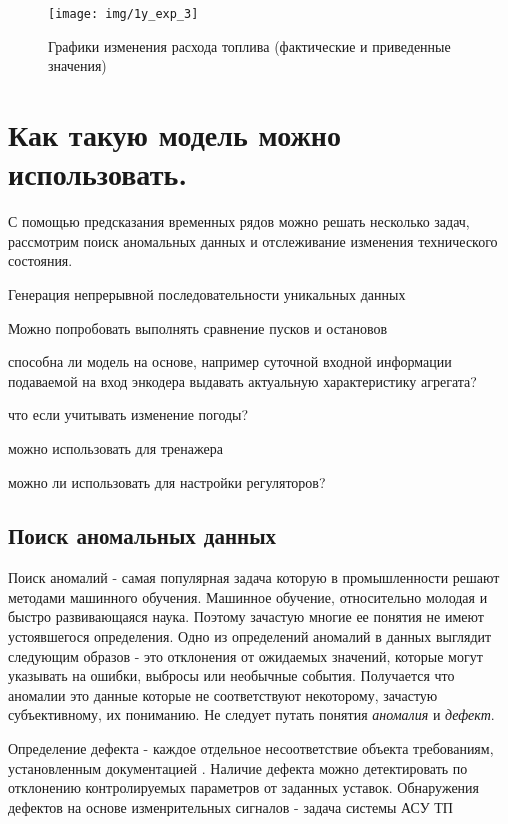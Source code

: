 \documentclass[12pt,a4paper]{article}
\begin{document}
\begin{figure}[htbp]
	\centering\texttt{[image: img/1y\_exp\_3]}
	\caption{Графики изменения расхода топлива (фактические и приведенные значения)}
	\label{fig:1y_exp_3}
\end{figure}

\newpage
\section{Как такую модель можно использовать.}

С помощью предсказания временных рядов можно решать несколько задач, рассмотрим поиск аномальных данных и отслеживание изменения технического состояния.

Генерация непрерывной последовательности уникальных данных

Можно попробовать выполнять сравнение пусков и остановов

способна ли модель на основе, например суточной входной информации подаваемой на вход энкодера выдавать актуальную характеристику агрегата?

что если учитывать изменение погоды?

можно использовать для тренажера

можно ли использовать для настройки регуляторов?



\subsection*{Поиск аномальных данных}

Поиск аномалий - самая популярная задача которую в промышленности решают методами машинного обучения. Машинное обучение, относительно молодая и быстро развивающаяся наука. Поэтому зачастую многие ее понятия не имеют устоявшегося определения. Одно из определений аномалий в данных выглядит следующим образов - это отклонения от ожидаемых значений, которые могут указывать на ошибки, выбросы или необычные события. Получается что аномалии это данные которые не соответствуют некоторому, зачастую субъективному, их пониманию. Не следует путать понятия {\it аномалия} и {\it дефект}.

Определение дефекта - каждое  отдельное несоответствие  объекта  требованиям, установленным документацией \cite{gost_27002}. Наличие дефекта можно детектировать по отклонению контролируемых параметров от заданных уставок.
Обнаружения дефектов на основе изменрительных сигналов - задача системы АСУ ТП
\end{document}
